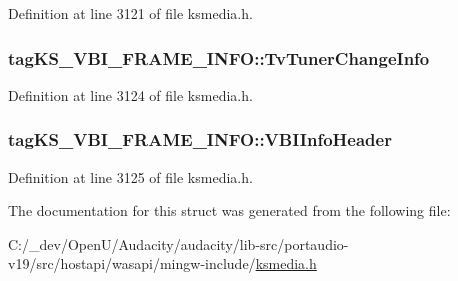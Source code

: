 Definition at line 3121 of file ksmedia.\+h.

\subsubsection[{\texorpdfstring{Tv\+Tuner\+Change\+Info}{TvTunerChangeInfo}}]{ tag\+K\+S\+\_\+\+V\+B\+I\+\_\+\+F\+R\+A\+M\+E\+\_\+\+I\+N\+F\+O\+::\+Tv\+Tuner\+Change\+Info}\hypertarget{structtag_k_s___v_b_i___f_r_a_m_e___i_n_f_o_a4d045870a25d0cab8aabb42d69b9c026}{}\label{structtag_k_s___v_b_i___f_r_a_m_e___i_n_f_o_a4d045870a25d0cab8aabb42d69b9c026}


Definition at line 3124 of file ksmedia.\+h.

\subsubsection[{\texorpdfstring{V\+B\+I\+Info\+Header}{VBIInfoHeader}}]{ tag\+K\+S\+\_\+\+V\+B\+I\+\_\+\+F\+R\+A\+M\+E\+\_\+\+I\+N\+F\+O\+::\+V\+B\+I\+Info\+Header}\hypertarget{structtag_k_s___v_b_i___f_r_a_m_e___i_n_f_o_a83deebc767f643043aee6711b272b7bb}{}\label{structtag_k_s___v_b_i___f_r_a_m_e___i_n_f_o_a83deebc767f643043aee6711b272b7bb}


Definition at line 3125 of file ksmedia.\+h.



The documentation for this struct was generated from the following file\+:\begin{DoxyCompactItemize}
\item 
C\+:/\+\_\+dev/\+Open\+U/\+Audacity/audacity/lib-\/src/portaudio-\/v19/src/hostapi/wasapi/mingw-\/include/\hyperlink{ksmedia_8h}{ksmedia.\+h}\end{DoxyCompactItemize}
